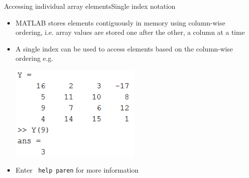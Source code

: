 \documentclass{beamer}
\begin{document}
\begin{frame}{Accessing individual array elements}{Single index notation}
	\begin{itemize}
		\item MATLAB stores elements contiguously in memory using column-wise ordering, i.e. array values are stored one after the other, a column at a time
		\item A single index can be used to access elements based on the column-wise ordering e.g.
		
		\includegraphics[width=0.5\textwidth]{array_access_columnwise}
		
		\item Enter \texttt{ help paren} for more information
	\end{itemize}
\end{frame}
\end{document}
